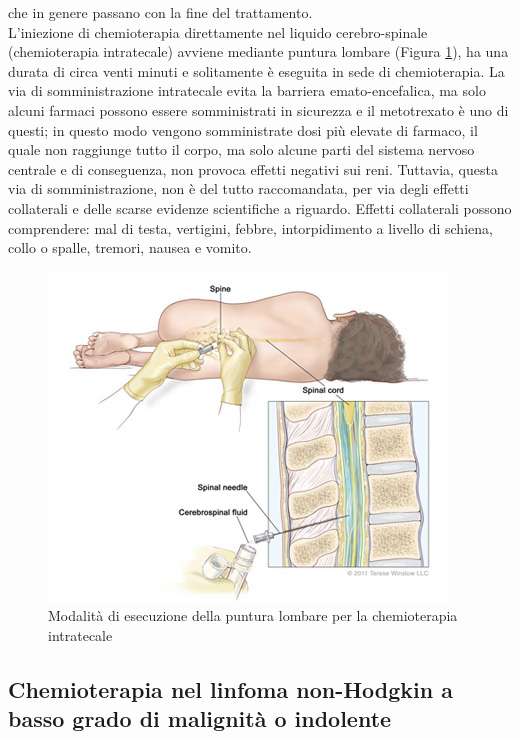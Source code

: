 che in genere passano con la fine del trattamento\cite{CNS}.\\
L’iniezione di chemioterapia direttamente nel liquido cerebro-spinale (chemioterapia intratecale) avviene mediante 
puntura lombare (Figura \ref{fig:FIGURE_4.1}), ha una durata di circa venti minuti e solitamente è eseguita in sede di 
chemioterapia. 
La via di somministrazione intratecale evita la barriera emato-encefalica, ma solo alcuni farmaci possono essere 
somministrati in sicurezza e il metotrexato è uno di questi; in questo modo vengono somministrate dosi più elevate di 
farmaco, il quale non raggiunge tutto il corpo, ma solo alcune parti del sistema nervoso centrale e di 
conseguenza, non provoca effetti negativi sui reni. Tuttavia, questa via di somministrazione, non è del tutto 
raccomandata, per via degli effetti collaterali e delle scarse evidenze scientifiche a riguardo. 
Effetti collaterali possono comprendere: mal di testa, vertigini, febbre, intorpidimento a livello di schiena, 
collo o spalle, tremori, nausea e vomito\cite{CNS}.\\

\begin{figure}[H]
    \begin{center}
    \includegraphics[width=0.6\columnwidth]{img/Lumbar-Puncture.jpeg}
    \end{center}
    \caption{Modalità di esecuzione della puntura lombare per la chemioterapia intratecale
    \cite{img39}}
    \label{fig:FIGURE_4.1}
\end{figure}

\subsection{Chemioterapia nel linfoma non-Hodgkin a basso grado di malignità o indolente}


